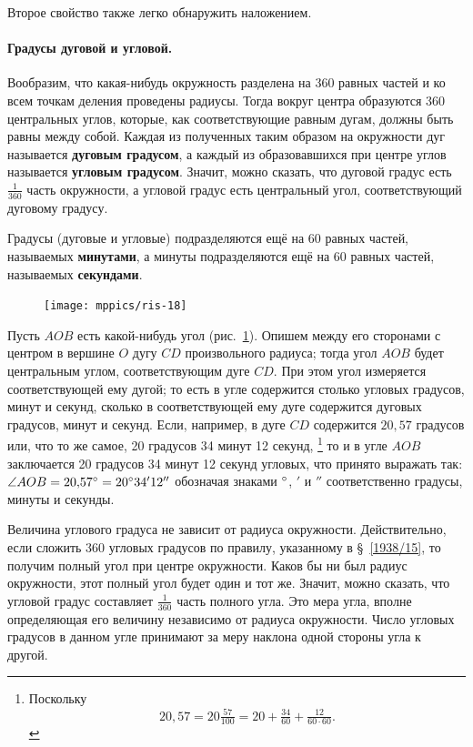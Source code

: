 \documentclass[twoside]{book}
\makeatletter
\newcommand{\rindex}[2][\imki@jobname]{%
  \index[#1]{\detokenize{#2}}%
}
\makeatother
\begin{document}
Второе свойство также легко обнаружить наложением.

\paragraph{Градусы дуговой и угловой.}\label{1938/18}
Вообразим, что какая-нибудь окружность разделена на 360 равных частей и ко всем точкам деления проведены радиусы.
Тогда вокруг центра образуются 360 центральных углов, которые, как соответствующие равным дугам, должны быть равны между собой.
Каждая из полученных таким образом на окружности дуг называется \rindex{градус}\textbf{дуговым градусом}, а каждый из образовавшихся при центре углов называется \textbf{угловым градусом}.
Значит, можно сказать, что дуговой градус есть $\tfrac1{360}$ часть окружности,
а угловой градус есть центральный угол, соответствующий дуговому градусу.

Градусы (дуговые и угловые) подразделяются ещё на 60 равных частей, называемых \rindex{минута}\textbf{минутами}, а минуты подразделяются ещё на 60 равных частей, называемых \rindex{секунда}\textbf{секундами}.

\begin{figure}[h!]
\centering
\texttt{[image: mppics/ris-18]}
\caption{}\label{1938/ris-18}
\end{figure}

Пусть $AOB$ есть какой-нибудь угол (рис.~\ref{1938/ris-18}).
Опишем между его сторонами с центром в вершине $O$ дугу $CD$ произвольного радиуса;
тогда угол $AOB$ будет центральным углом, соответствующим дуге $CD$.
При этом угол измеряется соответствующей ему дугой; то есть в угле содержится столько угловых градусов, минут и секунд, сколько в соответствующей ему дуге содержится дуговых градусов, минут и секунд.
Если, например, в дуге $CD$ содержится $20{,}57$ градусов или, что то же самое, 20 градусов 34 минут 12 секунд,%
\footnote{Поскольку \[20{,}57=20\tfrac{57}{100}=20+\tfrac{34}{60}+\tfrac{12}{60\cdot 60}.\]}
 то и в угле $AOB$ заключается 20 градусов 34 минут 12 секунд угловых, что принято выражать так:
$\angle AOB = 20{,}57\degree = 20\degree 34'12''$ обозначая знаками $\degree$, $'$ и $''$ соответственно градусы, минуты и секунды.

Величина углового градуса не зависит от радиуса окружности.
Действительно, если сложить 360 угловых градусов по правилу, указанному в §~\ref{1938/15}, то получим полный угол при центре окружности.
Каков бы ни был радиус окружности, этот полный угол будет один и тот же.
Значит, можно сказать, что угловой градус составляет $\tfrac1{360}$ часть полного угла.
Это мера угла, вполне определяющая его величину независимо от радиуса окружности.
Число угловых градусов в данном угле принимают за меру наклона одной стороны угла к другой.
\end{document}
